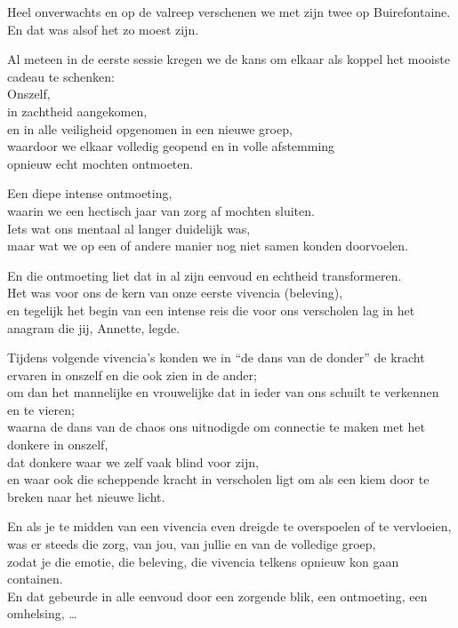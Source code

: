 \documentclass[
  11pt,
]{book}
\begin{document}
Heel onverwachts en op de valreep verschenen we met zijn twee op Buirefontaine.\\
En dat was alsof het zo moest zijn.

Al meteen in de eerste sessie kregen we de kans om elkaar als koppel het mooiste cadeau te schenken:\\
Onszelf,\\
in zachtheid aangekomen,\\
en in alle veiligheid opgenomen in een nieuwe groep,\\
waardoor we elkaar volledig geopend en in volle afstemming\\
opnieuw echt mochten ontmoeten.

Een diepe intense ontmoeting,\\
waarin we een hectisch jaar van zorg af mochten sluiten.\\
Iets wat ons mentaal al langer duidelijk was,\\
maar wat we op een of andere manier nog niet samen konden doorvoelen.

En die ontmoeting liet dat in al zijn eenvoud en echtheid transformeren.\\
Het was voor ons de kern van onze eerste vivencia (beleving),\\
en tegelijk het begin van een intense reis die voor ons verscholen lag in het anagram die jij, Annette, legde.

Tijdens volgende vivencia's konden we in ``de dans van de donder'' de kracht ervaren in onszelf en die ook zien in de ander;\\
om dan het mannelijke en vrouwelijke dat in ieder van ons schuilt te verkennen en te vieren;\\
waarna de dans van de chaos ons uitnodigde om connectie te maken met het donkere in onszelf,\\
dat donkere waar we zelf vaak blind voor zijn,\\
en waar ook die scheppende kracht in verscholen ligt om als een kiem door te breken naar het nieuwe licht.

En als je te midden van een vivencia even dreigde te overspoelen of te vervloeien,\\
was er steeds die zorg, van jou, van jullie en van de volledige groep,\\
zodat je die emotie, die beleving, die vivencia telkens opnieuw kon gaan containen.\\
En dat gebeurde in alle eenvoud door een zorgende blik, een ontmoeting, een omhelsing, \ldots{}
\end{document}
